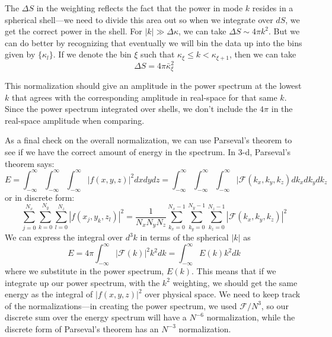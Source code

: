 \documentclass[11pt]{article}
\begin{document}
The $\Delta S$ in the weighting reflects the fact that the power 
in mode $k$ resides in a spherical shell---we need to divide this
area out so when we integrate over $dS$, we get the correct power
in the shell.  For $|k| \gg \Delta \kappa$, we can take $\Delta S \sim
4\pi k^2$.  But we can do better by recognizing that eventually we
will bin the data up into the bins given by $\{\kappa_l\}$.  If we
denote the bin $\xi$ such that $\kappa_\xi \le k < \kappa_{\xi+1}$,
then we can take
\begin{equation}
\Delta S = 4 \pi \bar{\kappa}_\xi^2
\end{equation}

This normalization should give an amplitude in the power spectrum at the lowest
$k$ that agrees with the corresponding amplitude in real-space for that same $k$.  
Since the power spectrum integrated over shells, we don't include the $4\pi$
in the real-space amplitude when comparing.

As a final check on the overall normalization, we can use Parseval's theorem
to see if we have the correct amount of energy in the spectrum.  In 3-d,
Parseval's theorem says:
\begin{equation}
E = \int_{-\infty}^{\infty} \int_{-\infty}^{\infty} \int_{-\infty}^{\infty} |f(x,y,z)|^2 dx dy dz = 
  \int_{-\infty}^{\infty} \int_{-\infty}^{\infty} \int_{-\infty}^{\infty}  |\mathcal{F}(k_x,k_y,k_z) dk_x dk_y dk_z
\end{equation}
or in discrete form:
\begin{equation}
\sum_{j=0}^{N_x} \sum_{k=0}^{N_y} \sum_{l=0}^{N_z}
   | f(x_j, y_k, z_l) |^2 = \frac{1}{N_x N_y N_z} 
 \sum_{k_x=0}^{N_x-1} \sum_{k_y=0}^{N_y-1} \sum_{k_z=0}^{N_z-1} 
   | \mathcal{F}(k_x, k_y, k_z) |^2
\end{equation}
We can express the integral over $d^3k$ in terms of the spherical $|k|$ as
\begin{equation}
E = 4\pi \int_{-\infty}^{\infty} |\mathcal{F}(k)|^2 k^2 dk = \int_{-\infty}^{\infty} E(k) k^2 dk
\end{equation}
where we substitute in the power spectrum, $E(k)$.  This means that if we integrate up our
power spectrum, with the $k^2$ weighting, we should get the same energy as the integral
of $|f(x,y,z)|^2$ over physical space.  We need to keep track of the normalizations---in
creating the power spectrum, we used $\mathcal{F}/N^3$, so our discrete sum over the energy
spectrum will have a $N^{-6}$ normalization, while the discrete form of Parseval's theorem
has an $N^{-3}$ normalization.
\end{document}
